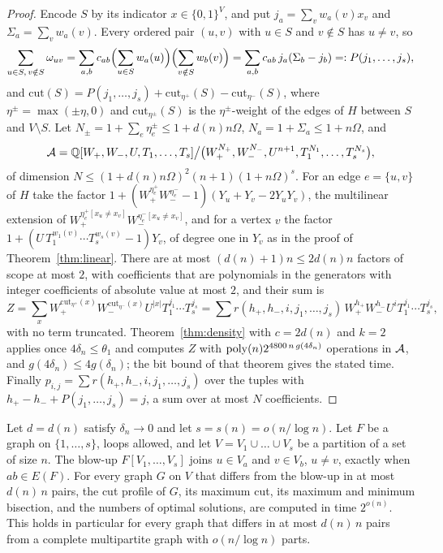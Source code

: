 \begin{proof}
Encode $S$ by its indicator $x\in\{0,1\}^V$, and put $j_a=\sum_vw_a(v)x_v$ and
$\Sigma_a=\sum_vw_a(v)$. Every ordered pair $(u,v)$ with $u\in S$ and $v\notin S$
has $u\ne v$, so
\begin{equation}\label{eq:lowrankcut}
  \sum_{u\in S,\,v\notin S}\omega_{uv}
  =\sum_{a,b}c_{ab}\Bigl(\sum_{u\in S}w_a(u)\Bigr)\Bigl(\sum_{v\notin S}w_b(v)\Bigr)
  =\sum_{a,b}c_{ab}\,j_a(\Sigma_b-j_b)=:P(j_1,\dots,j_s),
\end{equation}
and $\mathrm{cut}(S)=P(j_1,\dots,j_s)+\mathrm{cut}_{\eta^+}(S)-\mathrm{cut}_{\eta^-}(S)$,
where $\eta^{\pm}=\max(\pm\eta,0)$ and $\mathrm{cut}_{\eta^\pm}(S)$ is the
$\eta^\pm$-weight of the edges of $H$ between $S$ and $V\setminus S$. Let
$N_\pm=1+\sum_e\eta^\pm_e\le1+d(n)n\Omega$, $N_a=1+\Sigma_a\le1+n\Omega$, and
\[
  \mathcal{A}=\mathbb{Q}[W_+,W_-,U,T_1,\dots,T_s]\big/\bigl(W_+^{N_+},W_-^{N_-},U^{n+1},T_1^{N_1},\dots,T_s^{N_s}\bigr),
\]
of dimension $N\le(1+d(n)n\Omega)^2(n+1)(1+n\Omega)^s$. For an edge $e=\{u,v\}$ of $H$
take the factor $1+(W_+^{\eta^+_e}W_-^{\eta^-_e}-1)(Y_u+Y_v-2Y_uY_v)$, the multilinear
extension of $W_+^{\eta^+_e[x_u\ne x_v]}W_-^{\eta^-_e[x_u\ne x_v]}$, and for a vertex $v$
the factor $1+(U\,T_1^{w_1(v)}\cdots T_s^{w_s(v)}-1)Y_v$, of degree one in $Y_v$ as in
the proof of Theorem~\ref{thm:linear}. There are at most $(d(n)+1)n\le2d(n)n$ factors
of scope at most $2$, with coefficients that are polynomials in the generators with
integer coefficients of absolute value at most $2$, and their sum is
\[
  Z=\sum_xW_+^{\mathrm{cut}_{\eta^+}(x)}W_-^{\mathrm{cut}_{\eta^-}(x)}U^{|x|}T_1^{j_1}\cdots T_s^{j_s}
  =\sum r(h_+,h_-,i,j_1,\dots,j_s)\,W_+^{h_+}W_-^{h_-}U^{i}T_1^{j_1}\cdots T_s^{j_s},
\]
with no term truncated. Theorem~\ref{thm:density} with $c=2d(n)$ and $k=2$ applies
once $4\delta_n\le\theta_1$ and computes $Z$ with $\operatorname{poly}(n)2^{4800\,n\,g(4\delta_n)}$
operations in $\mathcal{A}$, and $g(4\delta_n)\le4g(\delta_n)$; the bit bound of that theorem
gives the stated time. Finally
$p_{i,j}=\sum r(h_+,h_-,i,j_1,\dots,j_s)$ over the tuples with
$h_+-h_-+P(j_1,\dots,j_s)=j$, a sum over at most $N$ coefficients.
\end{proof}

\begin{corollary}\label{cor:blowup}
Let $d=d(n)$ satisfy $\delta_n\to0$ and let $s=s(n)=o(n/\log n)$. Let $F$ be a graph
on $\{1,\dots,s\}$, loops allowed, and let $V=V_1\cup\dots\cup V_s$ be a partition of a
set of size $n$. The blow-up $F[V_1,\dots,V_s]$ joins $u\in V_a$ and $v\in V_b$,
$u\ne v$, exactly when $ab\in E(F)$. For every graph $G$ on $V$ that differs from
the blow-up in at most $d(n)\,n$ pairs, the cut profile of $G$, its maximum cut, its
maximum and minimum bisection, and the numbers of optimal solutions, are computed in
time $2^{o(n)}$. This holds in particular for every graph that differs in at most
$d(n)\,n$ pairs from a complete multipartite graph with $o(n/\log n)$ parts.
\end{corollary}

